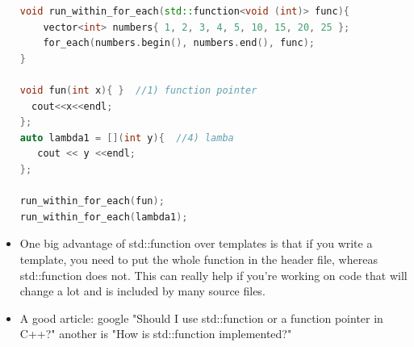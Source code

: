 \documentclass[a4paper,12pt,twoside]{book}
\begin{document}
\begin{itemize}
\begin{lstlisting}[frame=single, language=c++]
void run_within_for_each(std::function<void (int)> func){
    vector<int> numbers{ 1, 2, 3, 4, 5, 10, 15, 20, 25 };
    for_each(numbers.begin(), numbers.end(), func);
}

void fun(int x){ }  //1) function pointer
  cout<<x<<endl;
};
auto lambda1 = [](int y){  //4) lamba
   cout << y <<endl;
};

run_within_for_each(fun);
run_within_for_each(lambda1);
\end{lstlisting}


\item One big advantage of std::function over templates is that if you write a template, you need to put the whole function in the header file, whereas std::function does not. This can really help if you're working on code that will change a lot and is included by many source files.

\item A good article: google "Should I use std::function or a function pointer in C++?" another is "How is std::function implemented?"

\end{itemize}
\end{document}
